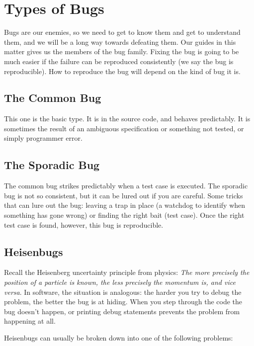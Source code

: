 




\section*{Types of Bugs}
Bugs are our enemies, so we need to get to know them and get to understand them, and we will be a long way towards defeating them. Our guides in this matter \cite{dgtd} gives us the members of the bug family. Fixing the bug is going to be much easier if the failure can be reproduced consistently (we say the bug is reproducible). How to reproduce the bug will depend on the kind of bug it is.

\subsection*{The Common Bug}
This one is the basic type. It is in the source code, and behaves predictably. It is sometimes the result of an ambiguous specification or something not tested, or simply programmer error.

\subsection*{The Sporadic Bug}
The common bug strikes predictably when a test case is executed. The sporadic bug is not so consistent, but it can be lured out if you are careful. Some tricks that can lure out the bug: leaving a trap in place (a watchdog to identify when something has gone wrong) or finding the right bait (test case). Once the right test case is found, however, this bug is reproducible.

\subsection*{Heisenbugs}

Recall the Heisenberg uncertainty principle from physics: \textit{The more precisely the position of a particle is known, the less precisely the momentum is, and vice versa}. In software, the situation is analogous: the harder you try to debug the problem, the better the bug is at hiding. When you step through the code the bug doesn't happen, or printing debug statements prevents the problem from happening at all. 

Heisenbugs can usually be broken down into one of the following problems:


